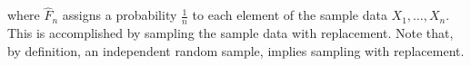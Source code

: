 \noindent where $\hat{F}_{n}$
assigns a probability
$\frac{1}{n}$ to each element of the sample data
$X_{1}, \dots, X_{n}$.
This is accomplished by sampling the sample data with replacement.
Note that, by definition,
an independent random sample,
implies sampling with replacement.